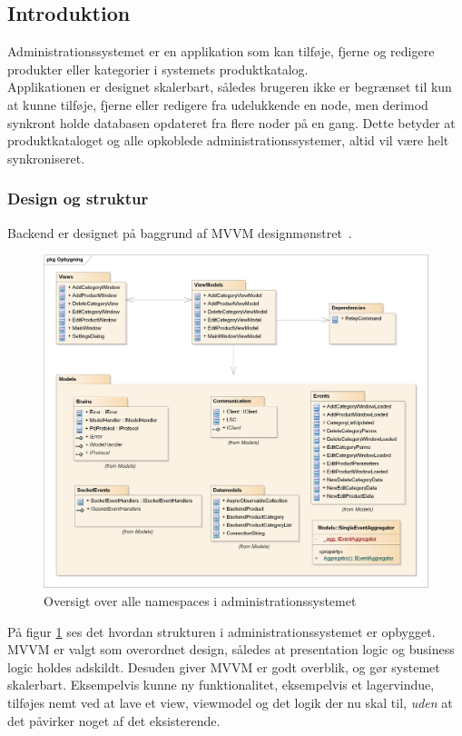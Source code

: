 \subsection{Introduktion}


Administrationssystemet er en applikation som kan tilføje, fjerne og redigere produkter eller kategorier i  systemets produktkatalog.\\
Applikationen er designet skalerbart, således brugeren ikke er begrænset til kun at kunne tilføje, fjerne eller redigere fra udelukkende en node, men derimod synkront holde databasen opdateret fra flere noder på en gang. Dette betyder at produktkataloget og alle opkoblede administrationssystemer, altid vil være helt synkroniseret.

\subsubsection{Design og struktur}
Backend er designet på baggrund af MVVM designmønstret~\cite{MVVM}. 

\begin{figure}[!h]
    \centering
    \includegraphics[width=1\textwidth]{Systemdesign/backend/Images/Opbygning.png}
    \caption{Oversigt over alle namespaces i administrationssystemet}
    \label{fig:oversigtAs}
\end{figure}

På figur \ref{fig:oversigtAs} ses det hvordan strukturen i administrationssystemet er opbygget. MVVM er valgt som overordnet design, således at presentation logic og business logic holdes adskildt. Desuden giver MVVM er godt overblik, og gør systemet skalerbart. Eksempelvis kunne ny funktionalitet, eksempelvis et lagervindue, tilføjes nemt ved at lave et view, viewmodel og det logik der nu skal til, \textit{uden} at det påvirker noget af det eksisterende.\\\\

